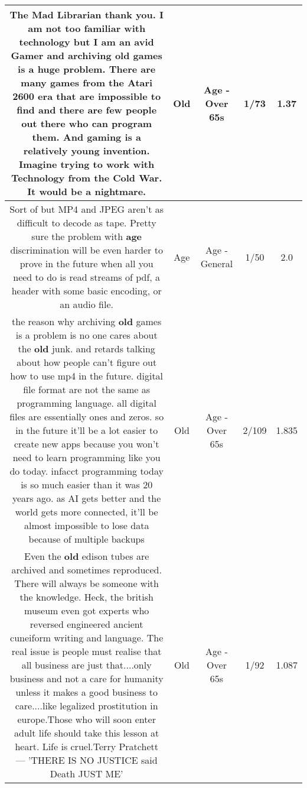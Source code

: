 \documentclass[11pt]{article}
\newlength\mylength
\begin{document}
\begin{center}
\begin{longtable}{|C{.65\mylength}|C{.30\mylength}|C{.12\mylength}|C{.12\mylength}|C{.12\mylength}|}
  \small The Mad Librarian thank you. I am not too familiar with technology but I am an avid Gamer and archiving \textbf{old} games is a huge problem. There are many games from the Atari 2600 era that are impossible to find and there are few people out there who can program them. And gaming is a relatively young invention. Imagine trying to work with Technology from the Cold War. It would be a nightmare.\normalsize   & Old & Age - Over 65s & 1/73 & 1.37 \\  \hline
  \small Sort of but MP4 and JPEG aren't as difficult to decode as tape. Pretty sure the problem with \textbf{age} discrimination will be even harder to prove in the future when all you need to do is read streams of pdf, a header with some basic encoding, or an audio file.\normalsize   & Age & Age - General & 1/50 & 2.0 \\  \hline
  \small the reason why archiving \textbf{old} games is a problem is no one cares about the \textbf{old} junk. and retards talking about how people can't figure out how to use mp4 in the future. digital file format are not the same as programming language. all digital files are essentially ones and zeros. so in the future it'll be a lot easier to create new apps because you won't need to learn programming like you do today. infacct programming today is so much easier than it was 20 years ago. as AI gets better and the world gets more connected, it'll be almost impossible to lose data because of multiple backups\normalsize   & Old & Age - Over 65s & 2/109 & 1.835 \\  \hline
  \small Even the \textbf{old} edison tubes are archived and sometimes reproduced. There will always be someone with the knowledge. Heck, the british museum even got experts who reversed engineered ancient cuneiform writing and language. The real issue is people must realise that all business are just that....only business and not a care for humanity unless it makes a good business to care....like legalized prostitution in europe.Those who will soon enter adult life should take this lesson at heart. Life is cruel.Terry Pratchett — 'THERE IS NO JUSTICE said Death JUST ME'\normalsize   & Old & Age - Over 65s & 1/92 & 1.087 \\  \hline

\end{longtable}
\end{center}
\end{document}
